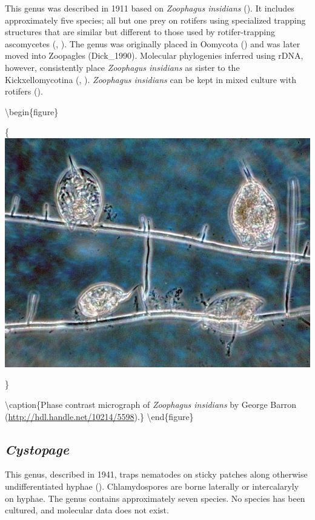 \documentclass[]{book}
\begin{document}
This genus was described in 1911 based on \emph{Zoophagus insidians} (\citet{Sommerstorff_1911}). It includes approximately five species; all but one prey on rotifers using specialized trapping structures that are similar but different to those used by rotifer-trapping ascomycetes (\citet{Whisler_1974}, \citet{Morikawa_1993}). The genus was originally placed in Oomycota (\citet{Prowse_1954}) and was later moved into Zoopagles (Dick\_1990). Molecular phylogenies inferred using rDNA, however, consistently place \emph{Zoophagus insidians} as sister to the Kickxellomycotina (\citet{Tanabe_2000}, \citet{White_2006}). \emph{Zoophagus insidians} can be kept in mixed culture with rotifers (\citet{Tanabe_2000}).

\textbackslash begin\{figure\}

\{\centering \includegraphics{img/Ch3_Fig4}

\}

\textbackslash caption\{Phase contrast micrograph of \emph{Zoophagus insidians} by George Barron (\url{http://hdl.handle.net/10214/5598}).\}\label{fig:ch3fig4}
\textbackslash end\{figure\}

\hypertarget{cystopage}{%
\subsection{\texorpdfstring{\emph{Cystopage}}{Cystopage}}\label{cystopage}}

This genus, described in 1941, traps nematodes on sticky patches along otherwise undifferentiated hyphae (\citet{Drechsler_1941}). Chlamydospores are borne laterally or intercalaryly on hyphae. The genus contains approximately seven species. No species has been cultured, and molecular data does not exist.
\end{document}
